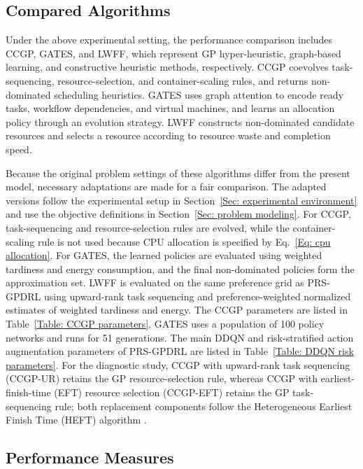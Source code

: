 \documentclass[10pt,journal]{IEEEtran}
\begin{document}
\subsection{Compared Algorithms}
\label{Sec: compared methods}

Under the above experimental setting, the performance comparison includes CCGP, GATES, and LWFF, which represent GP hyper-heuristic, graph-based learning, and constructive heuristic methods, respectively. CCGP \cite{ccgp} coevolves task-sequencing, resource-selection, and container-scaling rules, and returns non-dominated scheduling heuristics. GATES \cite{gates} uses graph attention to encode ready tasks, workflow dependencies, and virtual machines, and learns an allocation policy through an evolution strategy. LWFF \cite{lwff} constructs non-dominated candidate resources and selects a resource according to resource waste and completion speed.

Because the original problem settings of these algorithms differ from the present model, necessary adaptations are made for a fair comparison. The adapted versions follow the experimental setup in Section~\ref{Sec: experimental environment} and use the objective definitions in Section~\ref{Sec: problem modeling}. For CCGP, task-sequencing and resource-selection rules are evolved, while the container-scaling rule is not used because CPU allocation is specified by Eq.~\eqref{Eq: cpu allocation}. For GATES, the learned policies are evaluated using weighted tardiness and energy consumption, and the final non-dominated policies form the approximation set. LWFF is evaluated on the same preference grid as PRS-GPDRL using upward-rank task sequencing and preference-weighted normalized estimates of weighted tardiness and energy.
The CCGP parameters are listed in Table~\ref{Table: CCGP parameters}. GATES uses a population of 100 policy networks and runs for 51 generations. The main DDQN and risk-stratified action augmentation parameters of PRS-GPDRL are listed in Table~\ref{Table: DDQN risk parameters}. For the diagnostic study, CCGP with upward-rank task sequencing (CCGP-UR) retains the GP resource-selection rule, whereas CCGP with earliest-finish-time (EFT) resource selection (CCGP-EFT) retains the GP task-sequencing rule; both replacement components follow the Heterogeneous Earliest Finish Time (HEFT) algorithm \cite{Topcuoglu2002}.




\subsection{Performance Measures}
\label{Sec: evaluation metrics}
\end{document}
